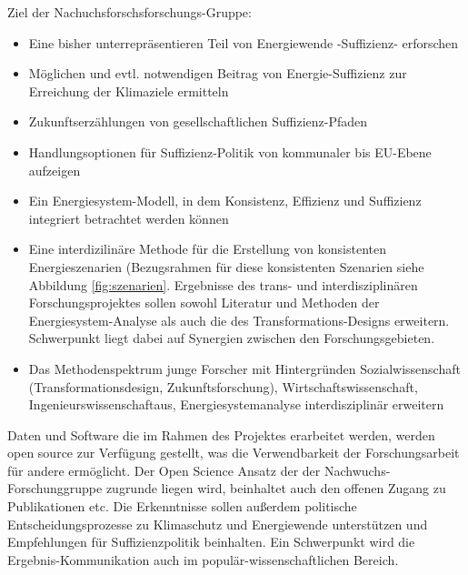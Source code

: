 \documentclass[a4paper,11pt,twoside]{scrartcl}
\begin{document}
Ziel der Nachuchsforschsforschungs-Gruppe:
\begin{itemize}
 \item Eine bisher unterrepräsentieren Teil von Energiewende -Suffizienz- erforschen
 \item Möglichen und evtl. notwendigen Beitrag von Energie-Suffizienz zur Erreichung der Klimaziele ermitteln
 \item Zukunftserzählungen von gesellschaftlichen Suffizienz-Pfaden
 \item Handlungsoptionen für Suffizienz-Politik von kommunaler bis EU-Ebene aufzeigen
 \item Ein Energiesystem-Modell, in dem Konsistenz, Effizienz und Suffizienz integriert betrachtet werden können
 \item Eine interdizilinäre Methode für die Erstellung von konsistenten Energieszenarien (Bezugsrahmen für diese konsistenten Szenarien siehe Abbildung \ref{fig:szenarien}. Ergebnisse des trans- und interdisziplinären Forschungsprojektes sollen sowohl Literatur und Methoden der Energiesystem-Analyse als auch die des Transformations-Designs erweitern. Schwerpunkt liegt dabei auf Synergien zwischen den Forschungsgebieten.
 \item Das Methodenspektrum junge Forscher mit Hintergründen Sozialwissenschaft (Transformationsdesign, Zukunftsforschung), Wirtschaftswissenschaft, Ingenieurswissenschaftaus, Energiesystemanalyse interdisziplinär erweitern
\end{itemize}

Daten und Software die im Rahmen des Projektes erarbeitet werden, werden open source zur Verfügung gestellt, was die Verwendbarkeit der Forschungsarbeit für andere ermöglicht. Der Open Science Ansatz der der Nachwuchs-Forschunggruppe zugrunde liegen wird, beinhaltet auch den offenen Zugang zu Publikationen etc. Die Erkenntnisse sollen außerdem politische Entscheidungsprozesse zu Klimaschutz und Energiewende unterstützen und Empfehlungen für Suffizienzpolitik beinhalten. Ein Schwerpunkt wird die Ergebnis-Kommunikation auch im populär-wissenschaftlichen Bereich.
\end{document}
